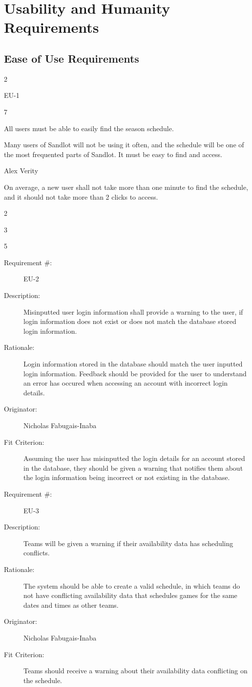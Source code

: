 \documentclass[12pt]{article}
\newenvironment{myreq}[1]{%
\setlist[description]{font=\normalfont\color{darkgray}}%
\begin{tcolorbox}[colframe=black,colback=white, sharp corners, boxrule=1pt]%
\bfseries\color{blue}%
\begin{description}#1}%
{\end{description}\end{tcolorbox}}
\newcommand{\twoinline}[2]{\begin{multicols}{2}#1 #2\end{multicols}}
\newcommand{\reqno}{\item[Requirement \#:]}
\newcommand{\reqevent}{\item[Event/BUC/PUC \#:]}
\newcommand{\reqdesc}{\item[Description:]}
\newcommand{\reqrat}{\item[Rationale:]}
\newcommand{\reqorig}{\item[Originator:]}
\newcommand{\reqfit}{\item[Fit Criterion:]}
\newcommand{\reqsatis}{\item[Customer Satisfaction:]}
\newcommand{\reqdissat}{\item[Customer Dissatisfaction:]}
\begin{document}
\section{Usability and Humanity Requirements}
\subsection{Ease of Use Requirements}

\begin{myreq}
  \twoinline
    {\reqno EU-1}
    {\reqevent 7}
  \reqdesc All users must be able to easily find the season schedule.
  \reqrat Many users of Sandlot will not be using it often, and the
  schedule will be one of the most frequented parts of Sandlot. It must be
  easy to find and access. 
  \reqorig Alex Verity
  \reqfit On average, a new user shall not take more than one minute to find
  the schedule, and it should not take more than 2 clicks to access.
  \twoinline
    {\reqsatis 3}
    {\reqdissat 5}
\end{myreq}

\begin{myreq}
  \reqno EU-2
  \reqdesc Misinputted user login information shall provide a warning to the
  user, if login information does not exist or does not match the database
  stored login information.
  \reqrat Login information stored in the database should match the user
  inputted login information. Feedback should be provided for the user to
  understand an error has occured when accessing an account with incorrect
  login details.
  \reqorig Nicholas Fabugais-Inaba
  \reqfit Assuming the user has misinputted the login details for
  an account stored in the database, they should be given a warning that
  notifies them about the login information being incorrect or not existing
  in the database.
  \twoinline
    {\reqsatis 3}
    {\reqdissat 3}
\end{myreq}

\begin{myreq}
  \reqno EU-3
  \reqdesc Teams will be given a warning if their availability data has
  scheduling conflicts.
  \reqrat The system should be able to create a valid schedule, in which
  teams do not have conflicting availability data that schedules games for
  the same dates and times as other teams.
  \reqorig Nicholas Fabugais-Inaba
  \reqfit Teams should receive a warning about their availability data
  conflicting on the schedule.
  \twoinline
    {\reqsatis 3}
    {\reqdissat 3}
\end{myreq}
\end{document}
